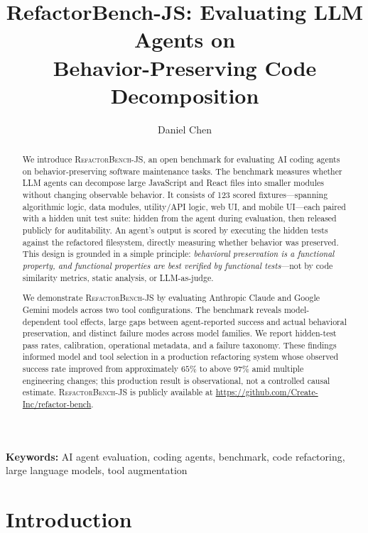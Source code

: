 \documentclass[11pt,letterpaper]{article}
\title{\textbf{RefactorBench-JS: Evaluating LLM Agents on\\Behavior-Preserving Code Decomposition}}
\author[1]{Daniel Chen}
\affil[1]{Anything, Inc.}
\date{}
\begin{document}
\maketitle

\begin{abstract}
We introduce \textsc{RefactorBench}-JS, an open benchmark for evaluating AI coding agents on behavior-preserving software maintenance tasks. The benchmark measures whether LLM agents can decompose large JavaScript and React files into smaller modules without changing observable behavior. It consists of 123 scored fixtures---spanning algorithmic logic, data modules, utility/API logic, web UI, and mobile UI---each paired with a hidden unit test suite: hidden from the agent during evaluation, then released publicly for auditability. An agent's output is scored by executing the hidden tests against the refactored filesystem, directly measuring whether behavior was preserved. This design is grounded in a simple principle: \emph{behavioral preservation is a functional property, and functional properties are best verified by functional tests}---not by code similarity metrics, static analysis, or LLM-as-judge.

We demonstrate \textsc{RefactorBench}-JS by evaluating Anthropic Claude and Google Gemini models across two tool configurations. The benchmark reveals model-dependent tool effects, large gaps between agent-reported success and actual behavioral preservation, and distinct failure modes across model families. We report hidden-test pass rates, calibration, operational metadata, and a failure taxonomy. These findings informed model and tool selection in a production refactoring system whose observed success rate improved from approximately $65\%$ to above $97\%$ amid multiple engineering changes; this production result is observational, not a controlled causal estimate. \textsc{RefactorBench}-JS is publicly available at \url{https://github.com/Create-Inc/refactor-bench}.
\end{abstract}

\medskip
\noindent\textbf{Keywords:} AI agent evaluation, coding agents, benchmark, code refactoring, large language models, tool augmentation

\section{Introduction}
\end{document}
